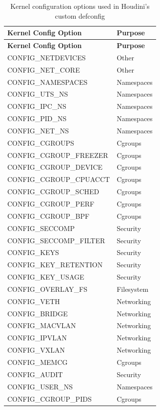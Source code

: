 \documentclass[12pt]{report}
\begin{document}
\begin{doublespace}
\begin{longtable}{|l|l|}
\caption{Kernel configuration options used in Houdini’s custom defconfig} \label{tab:kernel-config-categorized} \\
\hline
\textbf{Kernel Config Option} & \textbf{Purpose} \\
\hline
\endfirsthead

\hline
\textbf{Kernel Config Option} & \textbf{Purpose} \\
\hline
\endhead

CONFIG\_NETDEVICES & Other \\
CONFIG\_NET\_CORE & Other \\
CONFIG\_NAMESPACES & Namespaces \\
CONFIG\_UTS\_NS & Namespaces \\
CONFIG\_IPC\_NS & Namespaces \\
CONFIG\_PID\_NS & Namespaces \\
CONFIG\_NET\_NS & Namespaces \\
CONFIG\_CGROUPS & Cgroups \\
CONFIG\_CGROUP\_FREEZER & Cgroups \\
CONFIG\_CGROUP\_DEVICE & Cgroups \\
CONFIG\_CGROUP\_CPUACCT & Cgroups \\
CONFIG\_CGROUP\_SCHED & Cgroups \\
CONFIG\_CGROUP\_PERF & Cgroups \\
CONFIG\_CGROUP\_BPF & Cgroups \\
CONFIG\_SECCOMP & Security \\
CONFIG\_SECCOMP\_FILTER & Security \\
CONFIG\_KEYS & Security \\
CONFIG\_KEY\_RETENTION & Security \\
CONFIG\_KEY\_USAGE & Security \\
CONFIG\_OVERLAY\_FS & Filesystem \\
CONFIG\_VETH & Networking \\
CONFIG\_BRIDGE & Networking \\
CONFIG\_MACVLAN & Networking \\
CONFIG\_IPVLAN & Networking \\
CONFIG\_VXLAN & Networking \\
CONFIG\_MEMCG & Cgroups \\
CONFIG\_AUDIT & Security \\
CONFIG\_USER\_NS & Namespaces \\
CONFIG\_CGROUP\_PIDS & Cgroups \\

\end{longtable}
\end{doublespace}
\end{document}
